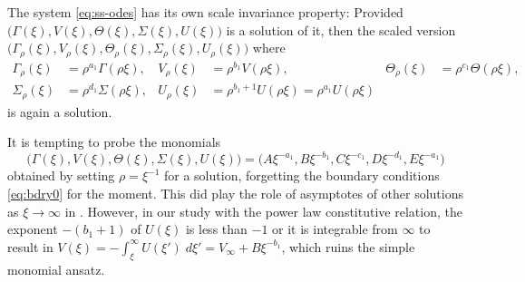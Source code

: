 \documentclass[a4paper,11pt]{article}
\theoremstyle{remark}
\begin{document}
The system \eqref{eq:ss-odes} has its own scale invariance property: Provided $\big(\Gamma(\xi), V(\xi), \Theta(\xi), \Sigma(\xi), U(\xi)\big)$ is a solution of it, then the scaled version $\big(\Gamma_\rho(\xi), V_\rho(\xi), \Theta_\rho(\xi), \Sigma_\rho(\xi), U_\rho(\xi)\big)$ where
\begin{align*}
 \Gamma_\rho(\xi)&=\rho^{a_1}\Gamma(\rho\xi), & V_\rho(\xi)&=\rho^{b_1}V(\rho\xi), & \Theta_\rho(\xi)&=\rho^{c_1}\Theta(\rho\xi),\\
 \Sigma_\rho(\xi)&=\rho^{d_1}\Sigma(\rho\xi), & U_\rho(\xi)&=\rho^{b_1+1}U(\rho\xi)=\rho^{a_1}U(\rho\xi)
\end{align*}
is again a solution.

It is tempting to probe the monomials $$\big(\Gamma(\xi), V(\xi), \Theta(\xi), \Sigma(\xi), U(\xi)\big)=\big(A\xi^{-a_1}, B\xi^{-b_1},C\xi^{-c_1},D\xi^{-d_1},E\xi^{-a_1}\big)$$ obtained by setting $\rho=\xi^{-1}$ for a solution, forgetting the boundary conditions \eqref{eq:bdry0} for the moment. This did play the role of asymptotes of other solutions as $\xi \rightarrow \infty$ in \cite{KOT14}. However, in our study with the power law constitutive relation, the exponent $-(b_1+1)$ of $U(\xi)$ is less than $-1$ or it is integrable from $\infty$ to result in $V(\xi) = -\int_\xi^\infty U(\xi') \; d\xi' =V_\infty + B\xi^{-b_1}$, which ruins the simple monomial ansatz.

%
\end{document}
